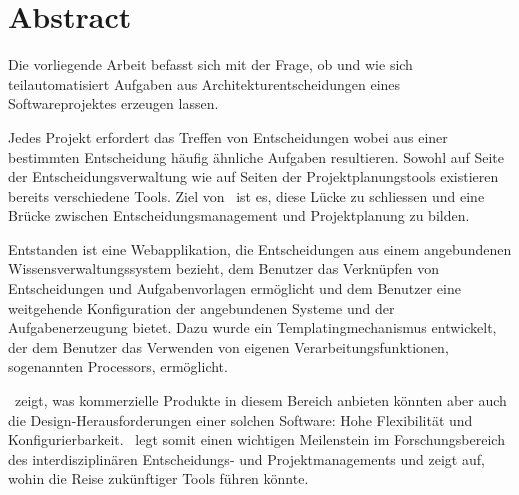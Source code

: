 \chapter{Abstract}

	Die vorliegende Arbeit befasst sich mit der Frage,
	ob und wie sich teilautomatisiert Aufgaben aus Architekturentscheidungen eines Softwareprojektes erzeugen lassen.

	Jedes Projekt erfordert das Treffen von Entscheidungen wobei aus einer bestimmten Entscheidung häufig ähnliche Aufgaben resultieren.
	Sowohl auf Seite der Entscheidungsverwaltung wie auf Seiten der Projektplanungstools existieren bereits verschiedene Tools.
	Ziel von \eeppi\ ist es, diese Lücke zu schliessen und eine Brücke zwischen Entscheidungsmanagement und Projektplanung zu bilden.

	Entstanden ist eine Webapplikation, die Entscheidungen aus einem angebundenen Wissensverwaltungssystem bezieht, 
	dem Benutzer das Verknüpfen von Entscheidungen und Aufgabenvorlagen ermöglicht 
	und dem Benutzer eine weitgehende Konfiguration der angebundenen Systeme und der Aufgabenerzeugung bietet. 
	Dazu wurde ein Templatingmechanismus entwickelt,
	der dem Benutzer das Verwenden von eigenen Verarbeitungsfunktionen, sogenannten Processors, ermöglicht.

	\eeppi\ zeigt, was kommerzielle Produkte in diesem Bereich anbieten könnten aber auch die Design-Herausforderungen einer solchen Software: 
	Hohe Flexibilität und Konfigurierbarkeit.
	\eeppi\ legt somit einen wichtigen Meilenstein im Forschungsbereich des interdisziplinären Entscheidungs- und Projektmanagements und
	zeigt auf, wohin die Reise zukünftiger Tools führen könnte.
